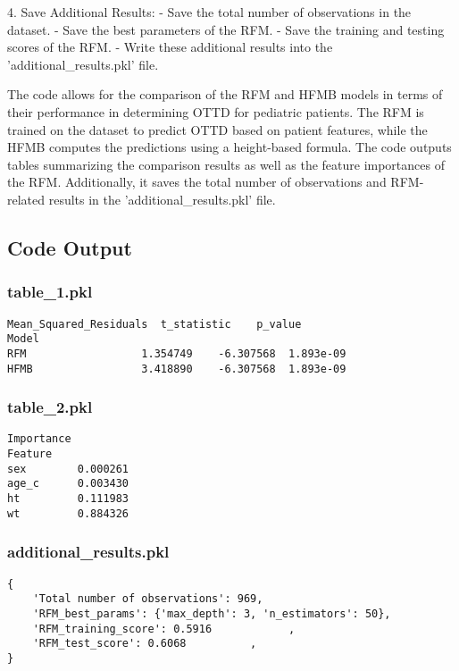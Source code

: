 \documentclass[11pt]{article}
\begin{document}
4. Save Additional Results:
   - Save the total number of observations in the dataset.
   - Save the best parameters of the RFM.
   - Save the training and testing scores of the RFM.
   - Write these additional results into the 'additional\_results.pkl' file.

The code allows for the comparison of the RFM and HFMB models in terms of their performance in determining OTTD for pediatric patients. The RFM is trained on the dataset to predict OTTD based on patient features, while the HFMB computes the predictions using a height-based formula. The code outputs tables summarizing the comparison results as well as the feature importances of the RFM. Additionally, it saves the total number of observations and RFM-related results in the 'additional\_results.pkl' file.

\subsection{Code Output}

\subsubsection*{table\_1.pkl}

\begin{Verbatim}[tabsize=4]
       Mean_Squared_Residuals  t_statistic    p_value
Model
RFM                  1.354749    -6.307568  1.893e-09
HFMB                 3.418890    -6.307568  1.893e-09
\end{Verbatim}

\subsubsection*{table\_2.pkl}

\begin{Verbatim}[tabsize=4]
         Importance
Feature
sex        0.000261
age_c      0.003430
ht         0.111983
wt         0.884326
\end{Verbatim}

\subsubsection*{additional\_results.pkl}

\begin{Verbatim}[tabsize=4]
{
    'Total number of observations': 969,
    'RFM_best_params': {'max_depth': 3, 'n_estimators': 50},
    'RFM_training_score': 0.5916            ,
    'RFM_test_score': 0.6068          ,
}
\end{Verbatim}
\end{document}

